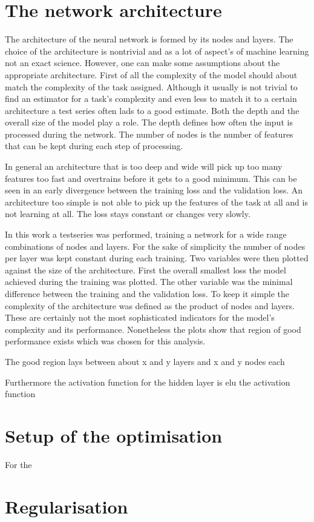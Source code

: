 \section{The network architecture}

The architecture of the neural network is formed by its nodes and layers. The choice of the architecture is nontrivial and as a lot of aspect's of machine learning not an exact science.
However, one can make some assumptions about the appropriate architecture.
First of all the complexity of the model should about match the complexity of the task assigned. Although it usually is not trivial to find an estimator for a task's complexity and even less to match it to a certain architecture a test series often lads to a good estimate.
Both the depth and the overall size of the model play a role. The depth defines how often the input is processed during the network. The number of nodes is the number of features that can be kept during each step of processing.

In general an architecture that is too deep and wide will pick up too many features too fast and overtrains before it gets to a good minimum. This can be seen in an early divergence between the training loss and the validation loss. An architecture too simple is not able to pick up the features of the task at all and is not learning at all. The loss stays constant or changes very slowly.

In this work a testseries was performed, training a network for a wide range combinations of nodes and layers. For the sake of simplicity the number of nodes per layer was kept constant during each training. Two variables were then plotted against the size of the architecture. First the overall smallest loss the model achieved during the training was plotted. The other variable was the minimal difference between the training and the validation loss. To keep it simple the complexity of the architecture was defined as the product of nodes and layers. These are certainly not the most sophisticated indicators for the model's complexity and its performance. Nonetheless the plots show that region of good performance exists which was chosen for this analysis.

The good region lays between about x and y layers and x and y nodes each

Furthermore the activation function for the hidden layer is elu
the activation function 

\section{Setup of the optimisation}

For the 

\section{Regularisation}